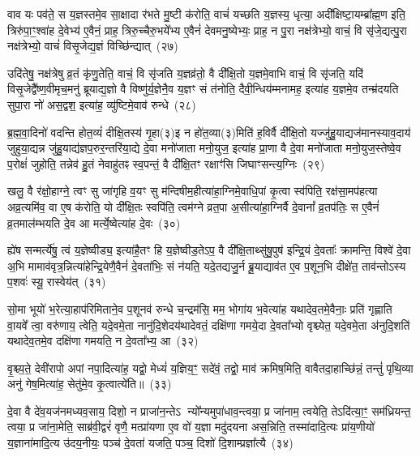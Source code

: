 वाव यः पव॑ते॒ स य॒ज्ञस्तमे॒व सा॒क्षादा र॑भते मु॒ष्टी क॑रोति॒ वाचं॑ यच्छति य॒ज्ञस्य॒ धृत्या॒ अदी᳚क्षिष्टा॒यम्ब्रा᳚ह्म॒ण इति॒ त्रिरु॑पा॒ꣳ॒श्वा॑ह दे॒वेभ्य॑ ए॒वैनं॒ प्राह॒ त्रिरु॒च्चैरु॒भये᳚भ्य ए॒वैनं॑ देवमनु॒ष्येभ्यः॒ प्राह॒ न पु॒रा नक्ष॑त्रेभ्यो॒ वाचं॒ वि सृ॑जे॒द्यत्पु॒रा नक्ष॑त्रेभ्यो॒ वाचं॑ विसृ॒जेद्य॒ज्ञं विच्छि॑न्द्यात्~(२७)

उदि॑तेषु॒ नक्ष॑त्रेषु व्र॒तं कृ॑णु॒तेति॒ वाचं॒ वि सृ॑जति य॒ज्ञव्र॑तो॒ वै दी᳚क्षि॒तो य॒ज्ञमे॒वाभि वाचं॒ वि सृ॑जति॒ यदि॑ विसृ॒जेद्वै᳚ष्ण॒वीमृच॒मनु॑ ब्रूयाद्य॒ज्ञो वै विष्णु॑र्य॒ज्ञेनै॒व य॒ज्ञꣳ सं त॑नोति॒ दैवी॒न्धिय॑म्मनामह॒ इत्या॑ह य॒ज्ञमे॒व तन्म्र॑दयति सुपा॒रा नो॑ अस॒द्वश॒ इत्या॑ह॒ व्यु॑ष्टिमे॒वाव॑ रुन्धे~(२८)

ब्र॒ह्म॒वा॒दिनो॑ वदन्ति होत॒व्यं॑ दीक्षि॒तस्य॑ गृ॒हा(३)इ न हो॑त॒व्या(३)मिति॑ ह॒विर्वै दी᳚क्षि॒तो यज्जु॑हु॒याद्यज॑मानस्याव॒दाय॑ जुहुया॒द्यन्न जु॑हु॒याद्य॑ज्ञप॒रुर॒न्तरि॑या॒द्ये दे॒वा मनो॑जाता मनो॒युज॒ इत्या॑ह प्रा॒णा वै दे॒वा मनो॑जाता मनो॒युज॒स्तेष्वे॒व प॒रोक्षं॑ जुहोति॒ तन्नेव॑ हु॒तं नेवाहु॑तꣴ स्व॒पन्तं॒ वै दी᳚क्षि॒तꣳ रक्षाꣳ॑सि जिघाꣳसन्त्य॒ग्निः~(२९)

खलु॒ वै र॑क्षो॒हाग्ने॒ त्वꣳ सु जा॑गृहि व॒यꣳ सु म॑न्दिषीम॒हीत्या॑हा॒ग्निमे॒वाधि॒पां कृ॒त्वा स्व॑पिति॒ रक्ष॑सा॒मप॑हत्या अव्र॒त्यमि॑व॒ वा ए॒ष क॑रोति॒ यो दी᳚क्षि॒तः स्वपि॑ति॒ त्वम॑ग्ने व्रत॒पा अ॒सीत्या॑हा॒ग्निर्वै दे॒वानां᳚ व्र॒तप॑तिः॒ स ए॒वैनं॑ व्र॒तमाल॑म्भयति दे॒व आ मर्त्ये॒ष्वेत्या॑ह दे॒वः~(३०)

ह्ये॑ष सन्मर्त्ये॑षु॒ त्वं य॒ज्ञेष्वीड्य॒ इत्या॑है॒तꣳ हि य॒ज्ञेष्वीड॒ते\-ऽप॒ वै दी᳚क्षि॒ताथ्सु॑षु॒पुष॑ इन्द्रि॒यं दे॒वताः᳚ क्रामन्ति॒ विश्वे॑ दे॒वा अ॒भि मामाव॑वृत्र॒न्नित्या॑हेन्द्रि॒येणै॒वैनं॑ दे॒वता॑भिः॒ सं न॑यति॒ यदे॒तद्यजु॒र्न ब्रू॒याद्याव॑त ए॒व प॒शून॒भि दीक्षे॑त॒ ताव॑न्तो\-ऽस्य प॒शवः॑ स्यू॒ रास्वेय॑त्~(३१)

सो॒मा भूयो॑ भ॒रेत्या॒हाप॑रिमिताने॒व प॒शूनव॑ रुन्धे च॒न्द्रम॑सि॒ मम॒ भोगा॑य भ॒वेत्या॑ह यथादेव॒तमे॒वैनाः॒ प्रति॑ गृह्णाति वा॒यवे᳚ त्वा॒ वरु॑णाय॒ त्वेति॒ यदे॒वमे॒ता नानु॑दि॒शेदय॑थादेवतं॒ दक्षि॑णा गमये॒दा दे॒वता᳚भ्यो वृश्च्येत॒ यदे॒वमे॒ता अ॑नुदि॒शति॑ यथादेव॒तमे॒व दक्षि॑णा गमयति॒ न दे॒वता᳚भ्य॒ आ~(३२)

वृ॒श्च्य॒ते॒ देवी॑रापो अपां नपा॒दित्या॑ह॒ यद्वो॒ मेध्यं॑ य॒ज्ञिय॒ꣳ॒ सदे॑वं॒ तद्वो॒ माव॑ क्रमिष॒मिति॒ वावैतदा॒हाच्छि॑न्नं॒ तन्तुं॑ पृथि॒व्या अनु॑ गेष॒मित्या॑ह॒ सेतु॑मे॒व कृ॒त्वात्ये॑ति॥~(३३)

{}%

दे॒वा वै दे॑व॒यज॑नमध्यव॒साय॒ दिशो॒ न प्राजा॑न॒न्ते\-ऽ न्यो᳚न्यमुपा॑धाव॒न्त्वया॒ प्र जा॑नाम॒ त्वयेति॒ ते\-ऽदि॑त्या॒ꣳ॒ सम॑ध्रियन्त॒ त्वया॒ प्र जा॑ना॒मेति॒ साब्र॑वी॒द्वरं॑ वृणै॒ मत्प्रा॑यणा ए॒व वो॑ य॒ज्ञा मदु॑दयना अस॒न्निति॒ तस्मा॑दादि॒त्यः प्रा॑य॒णीयो॑ य॒ज्ञाना॑मादि॒त्य उ॑दय॒नीयः॒ पञ्च॑ दे॒वता॑ यजति॒ पञ्च॒ दिशो॑ दि॒शाम्प्रज्ञा᳚त्यै~(३४)

